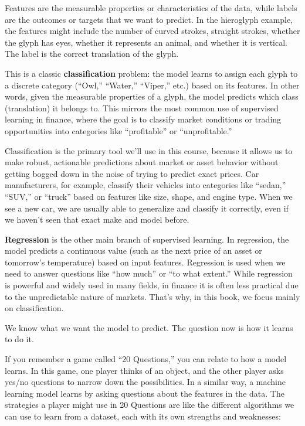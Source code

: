 Features are the measurable properties or characteristics of the data, while labels are the outcomes or targets that we want to predict.
In the hieroglyph example, the features might include the number of curved strokes, straight strokes, whether the glyph has eyes, whether it represents an animal, and whether it is vertical.
The label is the correct translation of the glyph.

This is a classic \textbf{classification} problem: the model learns to assign each glyph to a discrete category (``Owl,'' ``Water,'' ``Viper,'' etc.) based on its features. In other words, given the measurable properties of a glyph, the model predicts which class (translation) it belongs to. This mirrors the most common use of supervised learning in finance, where the goal is to classify market conditions or trading opportunities into categories like ``profitable'' or ``unprofitable.''




Classification is the primary tool we'll use in this course, because it allows us to make robust, actionable predictions about market or asset behavior without getting bogged down in the noise of trying to predict exact prices. Car manufacturers, for example, classify their vehicles into categories like ``sedan,'' ``SUV,'' or ``truck'' based on features like size, shape, and engine type. When we see a new car, we are usually able to generalize and classify it correctly, even if we haven't seen that exact make and model before.


\textbf{Regression} is the other main branch of supervised learning. In regression, the model predicts a continuous value (such as the next price of an asset or tomorrow's temperature) based on input features. Regression is used when we need to answer questions like ``how much'' or ``to what extent.'' While regression is powerful and widely used in many fields, in finance it is often less practical due to the unpredictable nature of markets. That's why, in this book, we focus mainly on classification.

We know what we want the model to predict. The question now is how it learns to do it.

If you remember a game called ``20 Questions,'' you can relate to how a model learns. In this game, one player thinks of an object, and the other player asks yes/no questions to narrow down the possibilities. In a similar way, a machine learning model learns by asking questions about the features in the data. The strategies a player might use in 20 Questions are like the different algorithms we can use to learn from a dataset, each with its own strengths and weaknesses:

